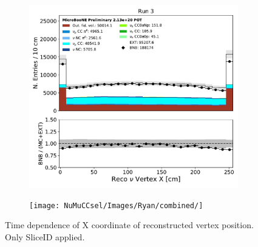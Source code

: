 \begin{figure}[hbt!]
\begin{center}
\begin{subfigure}[b]{0.35\textwidth}
    \end{subfigure}
    \begin{subfigure}[b]{0.35\textwidth}
        \centering
        \includegraphics[width=1.00\textwidth]{NuMuCCsel/Images/Ryan/Run3_nocrt/reco_nu_vtx_sce_x_08062020_samples_longest_noCRT_event_category.pdf}
    \end{subfigure} %
    \begin{subfigure}[b]{0.35\textwidth}
        \centering
        \texttt{[image: NuMuCCsel/Images/Ryan/combined/]}
    \end{subfigure}
\caption{Time dependence of X coordinate of reconstructed vertex position. Only SliceID applied.}
\label{fig:NuMuCCsel:timedep:vtxX}
\end{center}
\end{figure}


